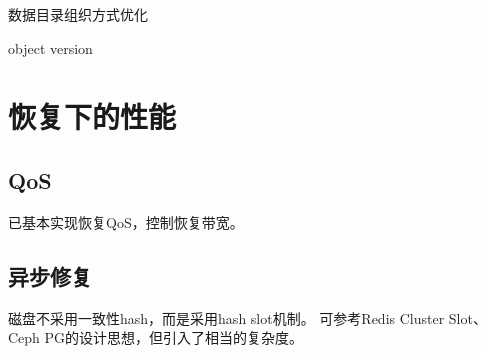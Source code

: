 \begin{enumbox}
\item 数据目录组织方式优化
\item object version
\end{enumbox}

\section{恢复下的性能}

\subsection{QoS}

已基本实现恢复QoS，控制恢复带宽。

\subsection{异步修复}

磁盘不采用一致性hash，而是采用hash slot机制。
可参考Redis Cluster Slot、Ceph PG的设计思想，但引入了相当的复杂度。
